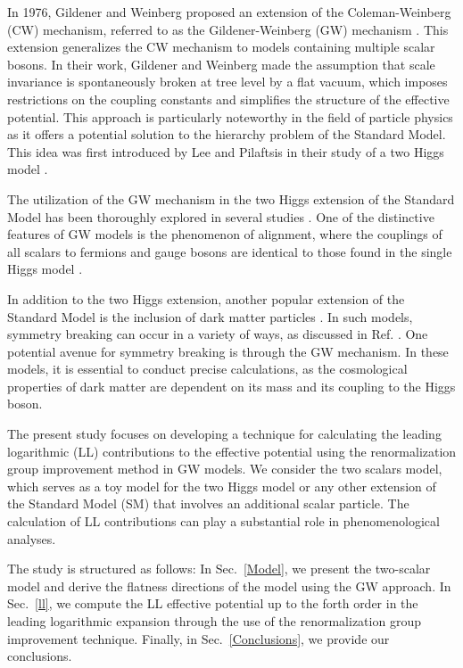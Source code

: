 \documentclass[11pt,a4paper,english,superscriptaddress,preprint,aps,prd]{revtex4}
\begin{document}
In 1976, Gildener and Weinberg proposed an extension of the Coleman-Weinberg (CW) mechanism, referred to as the Gildener-Weinberg (GW) mechanism \cite{Gildener:1976ih}. This extension generalizes the CW mechanism to models containing multiple scalar bosons. In their work, Gildener and Weinberg made the assumption that scale invariance is spontaneously broken at tree level by a flat vacuum, which imposes restrictions on the coupling constants and simplifies the structure of the effective potential. This approach is particularly noteworthy in the field of particle physics as it offers a potential solution to the hierarchy problem of the Standard Model. This idea was first introduced by Lee and Pilaftsis in their study of a two Higgs model \cite{Lee:2012jn}.

The utilization of the GW mechanism in the two Higgs extension of the Standard Model has been thoroughly explored in several studies \cite{Lee:2012jn,Hashino:2015nxa,Lane:2019dbc,Lane:2018ycs,Kannike:2021iyh}. One of the distinctive features of GW models is the phenomenon of alignment, where the couplings of all scalars to fermions and gauge bosons are identical to those found in the single Higgs model \cite{Gunion:2002zf,Weinberg:1967tq}.

In addition to the two Higgs extension, another popular extension of the Standard Model is the inclusion of dark matter particles \cite{Steele:2013fka, Endo:2015ifa, Cosme:2018nly, Arcadi:2019lka, Arcadi:2021mag}. In such models, symmetry breaking can occur in a variety of ways, as discussed in Ref. \cite{Chataignier:2018kay}. One potential avenue for symmetry breaking is through the GW mechanism. In these models, it is essential to conduct precise calculations, as the cosmological properties of dark matter are dependent on its mass and its coupling to the Higgs boson.

The present study focuses on developing a technique for calculating the leading logarithmic (LL) contributions to the effective potential using the renormalization group improvement method in GW models. We consider the two scalars model, which serves as a toy model for the two Higgs model or any other extension of the Standard Model (SM) that involves an additional scalar particle. The calculation of LL contributions can play a substantial role in phenomenological analyses.

The study is structured as follows: In Sec.~\ref{Model}, we present the two-scalar model and derive the flatness directions of the model using the GW approach. In Sec.~\ref{ll}, we compute the LL effective potential up to the forth order in the leading logarithmic expansion through the use of the renormalization group improvement technique. Finally, in Sec.~\ref{Conclusions}, we provide our conclusions.
\end{document}
